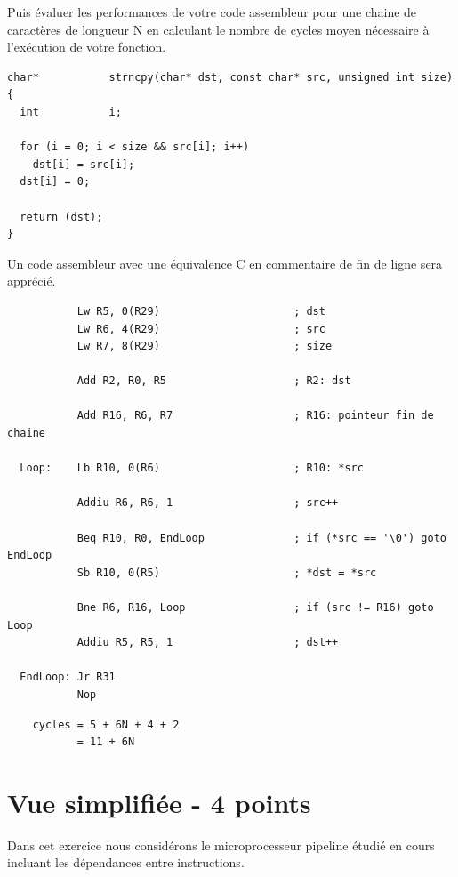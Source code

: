 Puis \'evaluer les performances de votre code assembleur pour une chaine
de caract\`eres de longueur N en calculant le nombre de cycles moyen
n\'ecessaire \`a l'ex\'ecution de votre fonction.

\begin{verbatim}
char*           strncpy(char* dst, const char* src, unsigned int size)
{
  int           i;

  for (i = 0; i < size && src[i]; i++)
    dst[i] = src[i];
  dst[i] = 0;

  return (dst);
}
\end{verbatim}

Un code assembleur avec une \'equivalence C en commentaire de fin de ligne
sera appr\'eci\'e.

\begin{correction}

  \begin{verbatim}
           Lw R5, 0(R29)                     ; dst
           Lw R6, 4(R29)                     ; src
           Lw R7, 8(R29)                     ; size

           Add R2, R0, R5                    ; R2: dst

           Add R16, R6, R7                   ; R16: pointeur fin de chaine

  Loop:    Lb R10, 0(R6)                     ; R10: *src

           Addiu R6, R6, 1                   ; src++

           Beq R10, R0, EndLoop              ; if (*src == '\0') goto EndLoop
           Sb R10, 0(R5)                     ; *dst = *src

           Bne R6, R16, Loop                 ; if (src != R16) goto Loop
           Addiu R5, R5, 1                   ; dst++

  EndLoop: Jr R31
           Nop
  \end{verbatim}

  \begin{verbatim}
    cycles = 5 + 6N + 4 + 2
           = 11 + 6N
  \end{verbatim}
\end{correction}

%
%

\section{Vue simplifi\'ee - 4 points}

Dans cet exercice nous consid\'erons le microprocesseur pipeline \'etudi\'e
en cours incluant les d\'ependances entre instructions.

